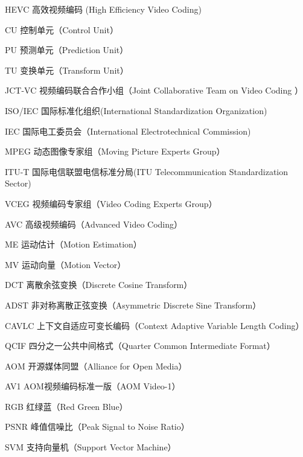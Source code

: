 \begin{denotation}[3cm]
\item[HEVC] 高效视频编码 (High Efficiency Video Coding)
\item[CU] 控制单元（Control Unit）
\item[PU] 预测单元（Prediction Unit）
\item[TU] 变换单元（Transform Unit）
\item[JCT-VC] 视频编码联合合作小组（Joint Collaborative Team on Video Coding ）
\item[ISO/IEC] 国际标准化组织(International Standardization Organization)
\item[IEC] 国际电工委员会（International Electrotechnical Commission)
\item[MPEG] 动态图像专家组（Moving Picture Experts Group）
\item[ITU-T] 国际电信联盟电信标准分局(ITU Telecommunication Standardization Sector)
\item[VCEG] 视频编码专家组（Video Coding Experts Group）
\item[AVC] 高级视频编码（Advanced Video Coding）
\item[ME] 运动估计（Motion Estimation）
\item[MV] 运动向量（Motion Vector）
\item[DCT] 离散余弦变换（Discrete Cosine Transform）
\item[ADST] 非对称离散正弦变换（Asymmetric Discrete Sine Transform）
\item[CAVLC] 上下文自适应可变长编码（Context Adaptive Variable Length Coding）
\item[QCIF] 四分之一公共中间格式（Quarter Common Intermediate Format）
\item[AOM] 开源媒体同盟（Alliance for Open Media）
\item[AV1] AOM视频编码标准一版（AOM Video-1）
\item[RGB] 红绿蓝（Red Green Blue）
\item[PSNR] 峰值信噪比（Peak Signal to Noise Ratio）
\item[SVM] 支持向量机（Support Vector Machine）
\end{denotation}
